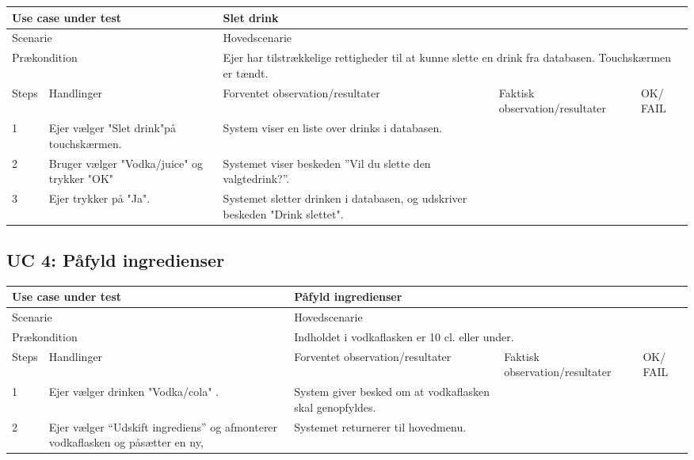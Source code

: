 \begin{table}[H]
\begin{tabular}{|p{1cm}|p{4cm}|p{4cm}|p{4cm}|p{1cm}|}
\hline
\multicolumn{2}{|p{5cm}|}{Use case under test} & \multicolumn{3}{p{9cm}|}{Slet drink}                                       \\ \hline
\multicolumn{2}{|p{5cm}|}{Scenarie}            & \multicolumn{3}{p{9cm}|}{Hovedscenarie}                                          \\ \hline
\multicolumn{2}{|p{5cm}|}{Prækondition}        & \multicolumn{3}{p{9cm}|}{Ejer har tilstrækkelige rettigheder til at kunne slette en drink fra databasen. Touchskærmen er tændt.}                                 \\ \hline
Steps               & Handlinger          & Forventet observation/resultater & Faktisk observation/resultater & OK/ FAIL \\ \hline
1    & Ejer vælger "Slet drink"på touchskærmen.  & System viser en liste over drinks i databasen. &   &         \\ \hline
2    & Bruger vælger "Vodka/juice" og trykker "OK"  & Systemet viser beskeden ”Vil du slette den valgtedrink?”.  &   &         \\ \hline
3    & Ejer trykker på "Ja".  & Systemet sletter drinken i databasen, og udskriver beskeden "Drink slettet".  &   &         \\ \hline

\end{tabular}
\end{table}

\subsection{UC 4: Påfyld ingredienser}

\begin{table}[H]
\begin{tabular}{|p{1cm}|p{4cm}|p{4cm}|p{4cm}|p{1cm}|}
\hline
\multicolumn{2}{|p{5cm}|}{Use case under test} & \multicolumn{3}{p{9cm}|}{Påfyld ingredienser}                                       \\ \hline
\multicolumn{2}{|p{5cm}|}{Scenarie}            & \multicolumn{3}{p{9cm}|}{Hovedscenarie}                                          \\ \hline
\multicolumn{2}{|p{5cm}|}{Prækondition}        & \multicolumn{3}{p{9cm}|}{Indholdet i vodkaflasken er 10 cl. eller under.}                                 \\ \hline
Steps               & Handlinger          & Forventet observation/resultater & Faktisk observation/resultater & OK/ FAIL \\ \hline
1    & Ejer vælger drinken "Vodka/cola" .  & System giver besked om at vodkaflasken skal genopfyldes.&   &         \\ \hline
2    & Ejer vælger “Udskift ingrediens” og afmonterer vodkaflasken og påsætter en ny,  & Systemet returnerer til hovedmenu.  &   &         \\ \hline

\end{tabular}
\end{table}


